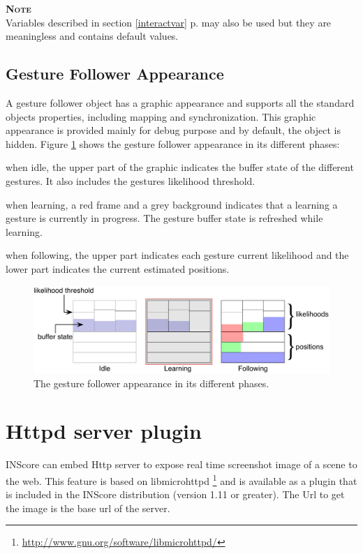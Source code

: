 \documentclass[a4paper,twoside]{report}
\newcommand{\sublevel}[1]	{\section{#1}}
\newcommand{\subsublevel}[1]	{\subsection{#1}}
\newcommand{\fullref}[1]	{\ref{#1} p.\pageref{#1}}
\newcommand{\note}	[1]		{\vspace{2mm}\textbf{\hspace{-0.9cm}\textbf{\textsc{Note #1}}}}
\let\olditemize\itemize
\let\oldenditemize\enditemize
\renewenvironment{itemize} 	{\olditemize \setlength{\itemsep}{1mm}}{\oldenditemize}
\begin{document}
\note{}\\
Variables described in section \fullref{interactvar} may also be used but they are meaningless and contains default values.


\subsublevel{Gesture Follower Appearance}\label{gfgraphs}

A gesture follower object has a graphic appearance and supports all the standard objects properties, including mapping and synchronization. This graphic appearance is provided mainly for debug purpose and by default, the object is hidden. Figure  \ref{fig:gfgraph} shows the gesture follower appearance in its different phases:
\begin{itemize}
\item when idle, the upper part of the graphic indicates the buffer state of the different gestures. It also includes the gestures likelihood threshold.
\item when learning, a red frame and a grey background indicates that a learning a gesture is currently in progress. The gesture buffer state is refreshed while learning.
\item when following, the upper part indicates each gesture current likelihood and the lower part indicates the current estimated positions.
\end{itemize}


\begin{figure}[h]
	\centering \includegraphics[width=0.95\columnwidth]{imgs/gesture-follower}
 \caption{The gesture follower appearance in its different phases.}
 \label{fig:gfgraph}
\end{figure}



\sublevel{Httpd server plugin}
\label{Httpd}

INScore can embed Http server to expose real time screenshot image of a scene to the web. This feature is based on libmicrohttpd \footnote{\url{http://www.gnu.org/software/libmicrohttpd/}} and is available as a plugin that is included in the INScore distribution (version 1.11 or greater). The Url to get the image is the base url of the server.
\end{document}
